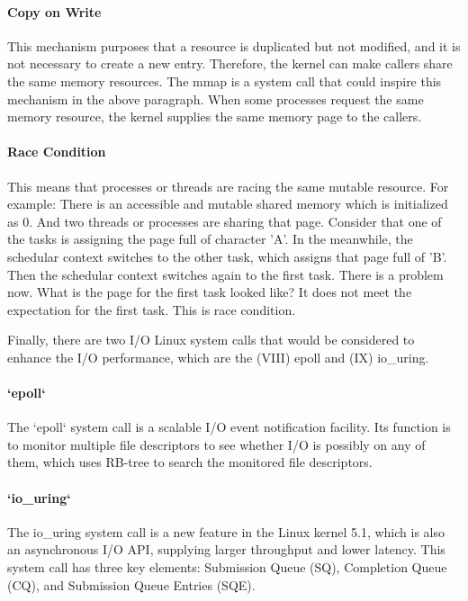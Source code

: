 \documentclass[12pt,a4paper]{article}
\begin{document}
\paragraph{Copy on Write}
This mechanism purposes that a resource is duplicated but not modified, and it is not
necessary to create a new entry. Therefore, the kernel can make callers share
the same memory resources. The mmap is a system call that could inspire this
mechanism in the above paragraph. When some processes request the same memory resource,
the kernel supplies the same memory page to the callers.

\paragraph{Race Condition}
This means that processes or threads are racing the same mutable resource. For example:
There is an accessible and mutable shared memory which is initialized as 0. And
two threads or processes are sharing that page. Consider that one of the tasks is assigning
the page full of character 'A'. In the meanwhile, the schedular context switches to
the other task, which assigns that page full of 'B'. Then the schedular context switches
again to the first task. There is a problem now. What is the page for the first
task looked like? It does not meet the expectation for the first task.
This is race condition.

Finally, there are two I/O Linux system calls that would be considered to enhance
the I/O performance, which are the (\RN{8}) epoll and (\RN{9}) io\_uring.

\paragraph{`epoll`}
The `epoll` system call is a scalable I/O event notification facility. Its function
is to monitor multiple file descriptors to see whether I/O is possibly on any of
them, which uses RB-tree to search the monitored file descriptors.

\paragraph{`io\_uring`}
The io\_uring system call is a new feature in the Linux kernel 5.1, which is also an
asynchronous I/O API, supplying larger throughput and lower latency. This system call
has three key elements: Submission Queue (SQ), Completion Queue (CQ), and Submission Queue
Entries (SQE).
\end{document}
